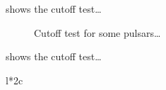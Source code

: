  shows the cutoff test\ldots

\begin{figure}
  \ifdefined\bwfigures
  \else
  \fi
  \caption{Cutoff test for some pulsars\dots}
  \label{fig:cutoff_test}
\end{figure}


 shows the cutoff test\ldots

\begin{deluxetable}{l*{2}c}
\tabletypesize{\scriptsize}

\end{deluxetable}
